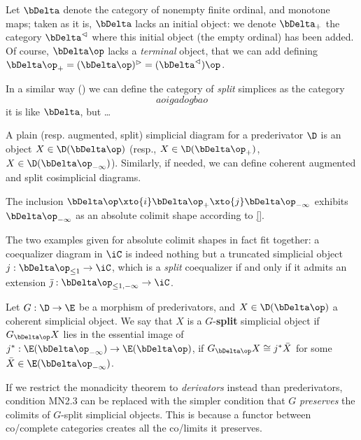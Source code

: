 \begin{defn}
Let $\bDelta$ denote the category of nonempty finite ordinal, and monotone maps; taken as it is, $\bDelta$ lacks an initial object: we denote $\bDelta_+$ the category $\bDelta^\lhd$ where this initial object (the empty ordinal) has been added. Of course, $\bDelta\op$ lacks a \emph{terminal} object, that we can add defining $\bDelta\op_+ = (\bDelta\op)^\rhd = (\bDelta^\lhd)\op$.

In a similar way (\cite[]{HA}) we can define the category of \emph{split} simplices as the category
\[
aoigadogbao
\]
it is like $\bDelta$, but \dots
\end{defn}
\begin{defn}
A plain (resp. augmented, split) simplicial diagram for a prederivator $\D$ is an object $X\in \D(\bDelta\op)$ (resp., $X\in\D(\bDelta\op_+)$, $X\in\D(\bDelta\op_{-\infty})$). Similarly, if needed, we can define coherent augmented and split cosimplicial diagrams.
\end{defn}
\begin{rmk}
The inclusion $\bDelta\op \xto{i} \bDelta\op_+ \xto{j} \bDelta\op_{-\infty}$ exhibits $\bDelta\op_{-\infty}$ as an absolute colimit shape according to \autoref{}.
\end{rmk}
\begin{rmk}
The two examples given for absolute colimit shapes in fact fit together: a coequalizer diagram in $\iC$ is indeed nothing but a truncated simplicial object $j : \bDelta\op_{\le 1} \to \iC$, which is a \emph{split} coequalizer if and only if it admits an extension $\bar\jmath : \bDelta\op_{\le 1, -\infty} \to \iC$.
\end{rmk}
\begin{defn}
Let $G : \D \to \E$ be a morphism of prederivators, and $X \in \D(\bDelta\op)$ a coherent simplicial object. We say that $X$ is a $G$-\textbf{split} simplicial object if $G_{\bDelta\op}X$ lies in the essential image of $j^* : \E(\bDelta\op_{-\infty})\to \E(\bDelta\op)$, \ie if $G_{\bDelta\op}X\cong j^*\bar X$ for some $\bar X \in \E(\bDelta\op_{-\infty})$.
\end{defn}
\begin{rmk}
 If we restrict the monadicity theorem to \emph{derivators} instead than prederivators, condition MN2.3 can be replaced with the simpler condition that $G$ \emph{preserves} the colimits of $G$-split simplicial objects. This is because a functor between co/complete categories creates all the co/limits it preserves.
 \end{rmk} 
